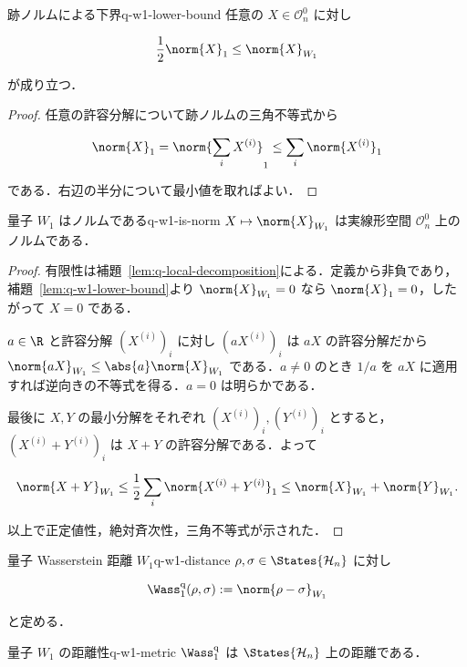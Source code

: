 \begin{lemma}{跡ノルムによる下界}{q-w1-lower-bound}
  任意の $X\in\mathcal{O}_n^0$ に対し

  \[
    \frac12\norm{X}_1\leq\norm{X}_{W_1}
  \]

  が成り立つ．
\end{lemma}

\begin{proof}
  任意の許容分解について跡ノルムの三角不等式から

  \[
    \norm{X}_1
    =\norm{\sum_iX^{(i)}}_1
    \leq\sum_i\norm{X^{(i)}}_1
  \]

  である．右辺の半分について最小値を取ればよい．
\end{proof}

\begin{theorem}{量子 $W_1$ はノルムである}{q-w1-is-norm}
  $X\mapsto\norm{X}_{W_1}$ は実線形空間 $\mathcal{O}_n^0$ 上のノルムである．
\end{theorem}

\begin{proof}
  有限性は補題~\ref{lem:q-local-decomposition}による．定義から非負であり，
  補題~\ref{lem:q-w1-lower-bound}より
  $\norm{X}_{W_1}=0$ なら $\norm{X}_1=0$，したがって $X=0$ である．

  $a\in\R$ と許容分解 $(X^{(i)})_i$ に対し $(aX^{(i)})_i$ は $aX$ の許容分解だから
  $\norm{aX}_{W_1}\leq\abs{a}\norm{X}_{W_1}$ である．$a\neq0$ のとき $1/a$ を
  $aX$ に適用すれば逆向きの不等式を得る．$a=0$ は明らかである．

  最後に $X,Y$ の最小分解をそれぞれ $(X^{(i)})_i,(Y^{(i)})_i$ とすると，
  $(X^{(i)}+Y^{(i)})_i$ は $X+Y$ の許容分解である．よって

  \[
    \norm{X+Y}_{W_1}
    \leq\frac12\sum_i\norm{X^{(i)}+Y^{(i)}}_1
    \leq\norm{X}_{W_1}+\norm{Y}_{W_1}.
  \]

  以上で正定値性，絶対斉次性，三角不等式が示された．
\end{proof}

\begin{definition}{量子 Wasserstein 距離 $W_1$}{q-w1-distance}
  $\rho,\sigma\in\States{\mathcal{H}_n}$ に対し

  \[
    \Wass_1^{\rm q}(\rho,\sigma):=\norm{\rho-\sigma}_{W_1}
  \]

  と定める．
\end{definition}

\begin{corollary}{量子 $W_1$ の距離性}{q-w1-metric}
  $\Wass_1^{\rm q}$ は $\States{\mathcal{H}_n}$ 上の距離である．
\end{corollary}

